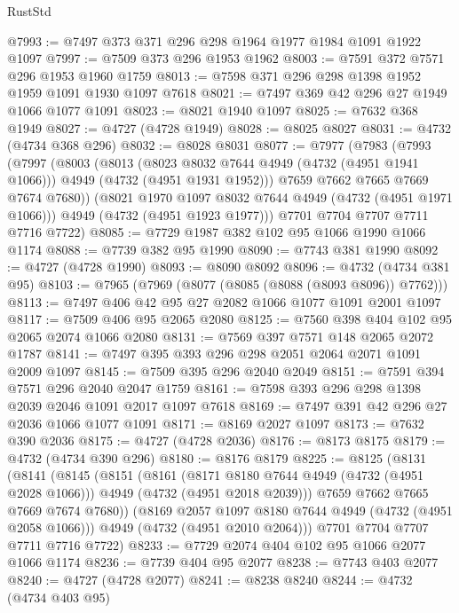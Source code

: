 \begin{lexlean}{RustStd}
\begin{coremodule}
{\begin{coremodule}
{{{{{{{{{{{{{{@7993 := @7497 @373 @371 @296 @298 @1964 @1977 @1984 @1091 @1922 @1097
@7997 := @7509 @373 @296 @1953 @1962
@8003 := @7591 @372 @7571 @296 @1953 @1960 @1759
@8013 := @7598 @371 @296 @298 @1398 @1952 @1959 @1091 @1930 @1097 @7618
@8021 := @7497 @369 @42 @296 @27 @1949 @1066 @1077 @1091
@8023 := @8021 @1940 @1097
@8025 := @7632 @368 @1949
@8027 := @4727 (@4728 @1949)
@8028 := @8025 @8027
@8031 := @4732 (@4734 @368 @296)
@8032 := @8028 @8031
@8077 := @7977
    (@7983
      (@7993
        (@7997
          (@8003
            (@8013
              (@8023 @8032 @7644 @4949 (@4732 (@4951 @1941 @1066)))
              @4949
              (@4732 (@4951 @1931 @1952)))
            @7659
            @7662
            @7665
            @7669
            @7674
            @7680))
        (@8021 @1970 @1097 @8032 @7644 @4949 (@4732 (@4951 @1971 @1066)))
        @4949
        (@4732 (@4951 @1923 @1977)))
      @7701
      @7704
      @7707
      @7711
      @7716
      @7722)
@8085 := @7729 @1987 @382 @102 @95 @1066 @1990 @1066 @1174
@8088 := @7739 @382 @95 @1990
@8090 := @7743 @381 @1990
@8092 := @4727 (@4728 @1990)
@8093 := @8090 @8092
@8096 := @4732 (@4734 @381 @95)
@8103 := @7965 (@7969 (@8077 (@8085 (@8088 (@8093 @8096)) @7762)))
@8113 := @7497 @406 @42 @95 @27 @2082 @1066 @1077 @1091 @2001 @1097
@8117 := @7509 @406 @95 @2065 @2080
@8125 := @7560 @398 @404 @102 @95 @2065 @2074 @1066 @2080
@8131 := @7569 @397 @7571 @148 @2065 @2072 @1787
@8141 := @7497 @395 @393 @296 @298 @2051 @2064 @2071 @1091 @2009 @1097
@8145 := @7509 @395 @296 @2040 @2049
@8151 := @7591 @394 @7571 @296 @2040 @2047 @1759
@8161 := @7598 @393 @296 @298 @1398 @2039 @2046 @1091 @2017 @1097 @7618
@8169 := @7497 @391 @42 @296 @27 @2036 @1066 @1077 @1091
@8171 := @8169 @2027 @1097
@8173 := @7632 @390 @2036
@8175 := @4727 (@4728 @2036)
@8176 := @8173 @8175
@8179 := @4732 (@4734 @390 @296)
@8180 := @8176 @8179
@8225 := @8125
    (@8131
      (@8141
        (@8145
          (@8151
            (@8161
              (@8171 @8180 @7644 @4949 (@4732 (@4951 @2028 @1066)))
              @4949
              (@4732 (@4951 @2018 @2039)))
            @7659
            @7662
            @7665
            @7669
            @7674
            @7680))
        (@8169 @2057 @1097 @8180 @7644 @4949 (@4732 (@4951 @2058 @1066)))
        @4949
        (@4732 (@4951 @2010 @2064)))
      @7701
      @7704
      @7707
      @7711
      @7716
      @7722)
@8233 := @7729 @2074 @404 @102 @95 @1066 @2077 @1066 @1174
@8236 := @7739 @404 @95 @2077
@8238 := @7743 @403 @2077
@8240 := @4727 (@4728 @2077)
@8241 := @8238 @8240
@8244 := @4732 (@4734 @403 @95)
}}}}}}}}}}}}}}
\end{coremodule}}
\end{coremodule}
\end{lexlean}
